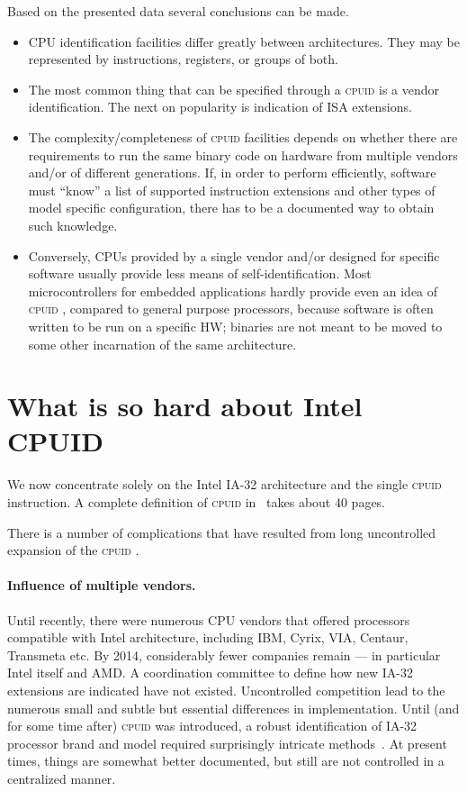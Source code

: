 \documentclass[a4paper,10pt,oneside,unicode]{article}
\newcommand{\cpuid}{\textsc{cpuid} }
\begin{document}
Based on the presented data several conclusions can be made.
\begin{itemize}
    \item {CPU} identification facilities differ greatly between architectures. They may be represented by instructions, registers, or groups of both.
    \item The most common thing that can be specified through a \cpuid is a vendor identification. The next on popularity is indication of ISA extensions.
    
    \item The complexity/completeness of \cpuid facilities depends on whether there are requirements to run the same binary code on hardware from multiple vendors and/or of different generations. If, in order to perform efficiently, software must “know” a list of supported instruction extensions and other types of model specific configuration, there has to be a documented way to obtain such knowledge.
    \item Conversely, {CPUs} provided by a single vendor and/or designed for specific software usually provide less means of self-identification. Most microcontrollers for embedded applications hardly provide even an idea of \cpuid, compared to general purpose processors, because software is often written to be run on a specific HW; binaries are not meant to be moved to some other incarnation of the same architecture.
    
\end{itemize}

\section{What is so hard about Intel CPUID}\label{sec:ia-32-cpuid}

We now concentrate solely on the Intel IA-32 architecture and the single \cpuid instruction. A complete definition of \cpuid in~\cite{intelmanual-7vols} takes about 40 pages.

There is a number of complications that have resulted from long uncontrolled expansion of the \cpuid.

\paragraph{Influence of multiple vendors.} Until recently, there were numerous {CPU} vendors that offered processors compatible with Intel architecture, including IBM, Cyrix, VIA, Centaur, Transmeta etc. By 2014, considerably fewer companies remain --- in particular Intel itself and AMD. A coordination committee to define how new IA-32 extensions are indicated have not existed. Uncontrolled competition lead to the numerous small and subtle but essential differences in implementation. 
Until (and for some time after) \cpuid was introduced, a robust identification of IA-32 processor brand and model required surprisingly intricate methods~\cite{cpuid-wars}. At present times, things are somewhat better documented, but still are not controlled in a centralized manner.
\end{document}
